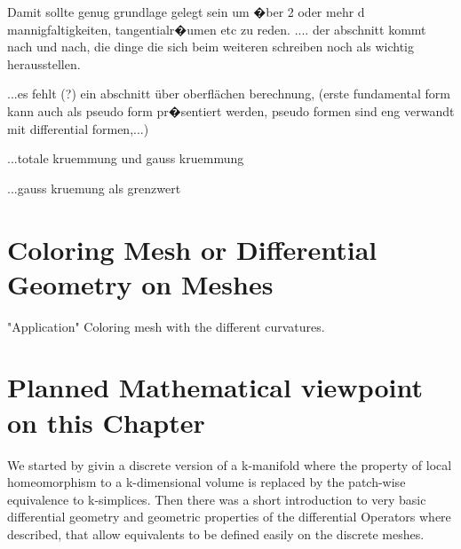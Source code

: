 Damit sollte genug grundlage gelegt sein um �ber 2 oder mehr d mannigfaltigkeiten, tangentialr�umen etc zu reden.
.... der abschnitt kommt nach und nach, die dinge die sich beim weiteren schreiben noch als wichtig herausstellen.

...es fehlt (?) ein abschnitt über oberflächen berechnung, (erste fundamental form kann auch als pseudo form pr�sentiert werden, pseudo formen sind eng verwandt mit differential formen,...)

...totale kruemmung und gauss kruemmung

...gauss kruemung als grenzwert

\section{Coloring Mesh or Differential Geometry on Meshes}

"Application" Coloring mesh with the different curvatures.
	
	\section{Planned Mathematical viewpoint on this Chapter}
		We started by givin a discrete version of a k-manifold where the property of local homeomorphism to a k-dimensional volume is replaced by the patch-wise equivalence to k-simplices. Then there was a short introduction to very basic differential geometry and geometric properties of the differential Operators where described, that allow equivalents to be defined easily on the discrete meshes. 	
